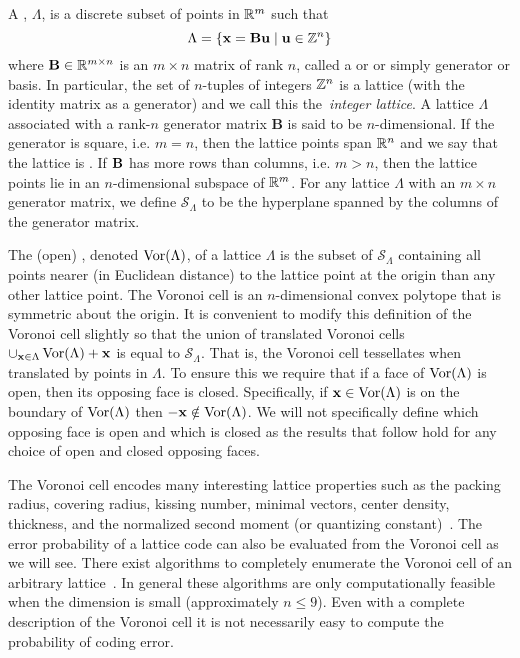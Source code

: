 \documentclass[journal]{IEEEtran}
\begin{document}
A , $\Lambda$, is a discrete subset of points in ${\mathbb R}^m$ such that
\[
   \Lambda = \{\mathbf{x} = \mathbf{B}\mathbf{u} \mid \mathbf{u} \in {\mathbb Z}^n \}
 \]
 where $\mathbf{B} \in {\mathbb R}^{m \times n}$ is an $m \times n$ matrix of rank $n$, called a  or  or simply generator or basis. In particular, the set of $n$-tuples of integers ${\mathbb Z}^n$ is a lattice (with the identity matrix as a generator) and we call this the~\emph{integer lattice}. A lattice $\Lambda$ associated with a rank-$n$ generator matrix $\mathbf{B}$ is said to be $n$-dimensional. If the generator is square, i.e. $m = n$, then the lattice points span ${\mathbb R}^n$ and we say that the lattice is . If $\mathbf{B}$ has more rows than columns, i.e. $m > n$, then the lattice points lie in an $n$-dimensional subspace of ${\mathbb R}^m$. For any lattice $\Lambda$ with an $m \times n$ generator matrix, we define $\mathcal{S}_{\Lambda}$ to be the hyperplane spanned by the columns of the generator matrix. %

The (open) , denoted $\operatorname{Vor}(\Lambda)$, of a lattice $\Lambda$ is the subset of $\mathcal{S}_{\Lambda}$ containing all points nearer (in Euclidean distance) to the lattice point at the origin than any other lattice point. The Voronoi cell is an $n$-dimensional convex polytope that is symmetric about the origin.  It is convenient to modify this definition of the Voronoi cell slightly so that the union of translated Voronoi cells $\cup_{\mathbf{x} \in \Lambda}\operatorname{Vor}(\Lambda) + \mathbf{x}$ is equal to  $\mathcal{S}_{\Lambda}$.  That is, the Voronoi cell tessellates when translated by points in $\Lambda$.  To ensure this we require that if a face of $\operatorname{Vor}(\Lambda)$ is open, then its opposing face is closed. Specifically, if $\mathbf{x} \in \operatorname{Vor}(\Lambda)$ is on the boundary of $\operatorname{Vor}(\Lambda)$ then $-\mathbf{x} \notin \operatorname{Vor}(\Lambda)$.  We will not specifically define which opposing face is open and which is closed as the results that follow hold for any choice of open and closed opposing faces.

The Voronoi cell encodes many interesting lattice properties such as the packing radius, covering radius, kissing number, minimal vectors, center density, thickness, and the normalized second moment (or quantizing constant)~\cite{Viterbo_diamond_cutting_1996, SPLAG}. The error probability of a lattice code can also be evaluated from the Voronoi cell as we will see.  There exist algorithms to completely enumerate the Voronoi cell of an arbitrary lattice~\cite{Viterbo_diamond_cutting_1996,Sikiric_complex_algs_vor_cells_2009,Sikiric_vor_reduction_covering_2008,Valentin2003_coverings_tilings_low_dimension}.  In general these algorithms are only computationally feasible when the dimension is small (approximately $n \leq 9$).  Even with a complete description of the Voronoi cell it is not necessarily easy to compute the probability of coding error.
\end{document}
